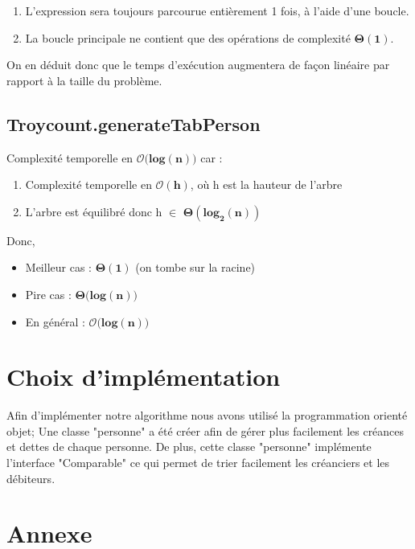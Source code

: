 \documentclass[12pt, a4paper, table]{article}
\begin{document}
\begin{enumerate}
	\item L'expression sera toujours parcourue entièrement 1 fois, à l'aide d'une boucle.
	\item La boucle principale ne contient que des opérations de complexité $\mathbf{\Theta (1)}$.
\end{enumerate}

\noindent On en déduit donc que le temps d'exécution augmentera de façon linéaire par rapport à la taille du problème.

\subsection{Troycount.generateTabPerson}
\noindent Complexité temporelle en $\mathbf{\mathcal{O}(}\mathbf{log (n))}$ car :
\begin{enumerate}
	\item Complexité temporelle en $\mathbf{\mathcal{O}(h)}$, où h est la hauteur de l’arbre
	\item L'arbre est équilibré donc h $\in$ $\mathbf{\Theta(\mathbf{log}_{2} (n))}$
\end{enumerate}
Donc, 
\begin{itemize}
	\item Meilleur cas : $\mathbf{\Theta (1)}$ (on tombe sur la racine)
	\item Pire cas : $\mathbf{\Theta(}\mathbf{log (n))}$
	\item En général : $\mathbf{\mathcal{O}(}\mathbf{log (n))}$
\end{itemize}



\section{Choix d'implémentation}

Afin d'implémenter notre algorithme nous avons utilisé la programmation orienté objet; Une classe "personne" a été créer afin de gérer plus facilement les créances et dettes de chaque personne. De plus, cette classe "personne" implémente l'interface "Comparable" ce qui permet de trier facilement les créanciers et les débiteurs. 



\newpage
\section*{Annexe}
\end{document}
